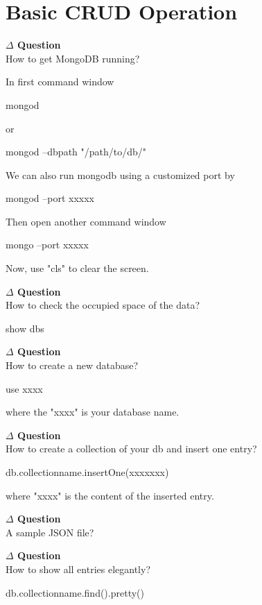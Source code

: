 \documentclass[12pt]{article}
\newenvironment{que}
    { \begin{mdframed}[backgroundcolor=green!20] \textbf{$\Delta$ Question} \\}
    {  \end{mdframed}}
\begin{document}
\section{Basic CRUD Operation}
\begin{que}
How to get MongoDB running?
\end{que}
\noindent
In first command window
\begin{code}
mongod
\end{code}
or
\begin{code}
mongod --dbpath "/path/to/db/"
\end{code}
We can also run mongodb using a customized port by
\begin{code}
mongod --port xxxxx
\end{code}
Then open another command window
\begin{code}
mongo --port xxxxx
\end{code}
Now, use "cls" to clear the screen.
\begin{que}
How to check the occupied space of the data?
\end{que}
\begin{code}
show dbs
\end{code}
\begin{que}
How to create a new database?
\end{que}
\begin{code}
use xxxx
\end{code}
where the "xxxx" is your database name.
\begin{que}
How to create a collection of your db and insert one entry?
\end{que}
\begin{code}
db.collectionname.insertOne({xxxxxxx})
\end{code}
where "xxxx" is the content of the inserted entry.
\begin{que}
A sample JSON file?
\end{que}
\begin{code}
\end{code}
\begin{que}
How to show all entries elegantly?
\end{que}
\begin{code}
db.collectionname.find().pretty()
\end{code}
\end{document}
